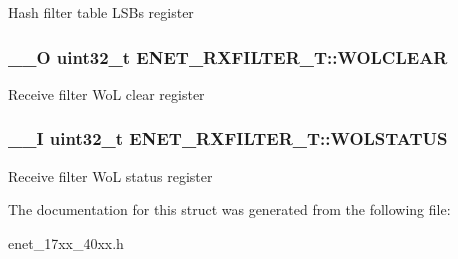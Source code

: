 Hash filter table L\+S\+Bs register \hypertarget{struct_e_n_e_t___r_x_f_i_l_t_e_r___t_acc4b5d489de8f522d567436de4b10d91}{
\subsubsection[{W\+O\+L\+C\+L\+E\+A\+R}]{\setlength{\rightskip}{0pt plus 5cm}\+\_\+\+\_\+\+O uint32\+\_\+t E\+N\+E\+T\+\_\+\+R\+X\+F\+I\+L\+T\+E\+R\+\_\+\+T\+::\+W\+O\+L\+C\+L\+E\+A\+R}}\label{struct_e_n_e_t___r_x_f_i_l_t_e_r___t_acc4b5d489de8f522d567436de4b10d91}
Receive filter Wo\+L clear register \hypertarget{struct_e_n_e_t___r_x_f_i_l_t_e_r___t_a40eedf8542d1e384d39cc5fca3fffffb}{
\subsubsection[{W\+O\+L\+S\+T\+A\+T\+U\+S}]{\setlength{\rightskip}{0pt plus 5cm}\+\_\+\+\_\+\+I uint32\+\_\+t E\+N\+E\+T\+\_\+\+R\+X\+F\+I\+L\+T\+E\+R\+\_\+\+T\+::\+W\+O\+L\+S\+T\+A\+T\+U\+S}}\label{struct_e_n_e_t___r_x_f_i_l_t_e_r___t_a40eedf8542d1e384d39cc5fca3fffffb}
Receive filter Wo\+L status register 

The documentation for this struct was generated from the following file\+:\begin{DoxyCompactItemize}
\item 
enet\+\_\+17xx\+\_\+40xx.\+h\end{DoxyCompactItemize}
